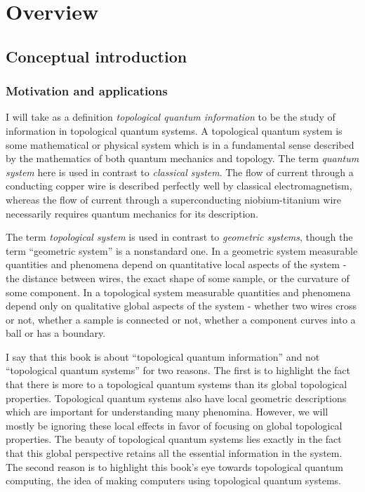 \section{Overview}
\label{overview}

\subsection{Conceptual introduction}
\label{conceptual introduction}

\subsubsection{Motivation and applications}

I will take as a definition \textit{topological quantum information} to be the study of information in topological quantum systems. A topological quantum system is some mathematical or physical system which is in a fundamental sense described by the mathematics of both quantum mechanics and topology. The term \textit{quantum system} here is used in contrast to \textit{classical system}. The flow of current through a conducting copper wire is described perfectly well by classical electromagnetism, whereas the flow of current through a superconducting niobium-titanium wire necessarily requires quantum mechanics for its description.

The term \textit{topological system} is used in contrast to \textit{geometric systems}, though the term “geometric system” is a nonstandard one. In a geometric system measurable quantities and phenomena depend on quantitative local aspects of the system - the distance between wires, the exact shape of some sample, or the curvature of some component. In a topological system measurable quantities and phenomena depend only on qualitative global aspects of the system - whether two wires cross or not, whether a sample is connected or not, whether a component curves into a ball or has a boundary.

I say that this book is about “topological quantum information” and not “topological quantum systems” for two reasons. The first is to highlight the fact that there is more to a topological quantum systems than its global topological properties. Topological quantum systems also have local geometric descriptions which are important for understanding many phenomina. However, we will mostly be ignoring these local effects in favor of focusing on global topological properties. The beauty of topological quantum systems lies exactly in the fact that this global perspective retains all the essential information in the system. The second reason is to highlight this book’s eye towards topological quantum computing, the idea of making computers using topological quantum systems. 

